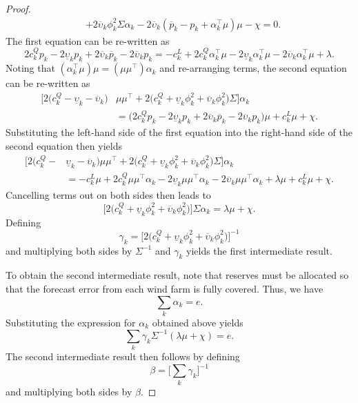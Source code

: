 \documentclass{article}
\begin{document}
\begin{proof}
\begin{align*}
&+ 2 \overline{\upsilon}_k \phi_k^2 \Sigma \alpha_k - 2 \overline{\upsilon}_k (\overline{p}_k - p_k + \alpha_k^\top \mu) \mu - \chi = 0.
\end{align*}
The first equation can be re-written as
\begin{equation*}
2c_k^Q p_k - 2 \underline{\upsilon}_k p_k + 2 \overline{\upsilon}_k \overline{p}_k - 2 \overline{\upsilon}_k p_k = -c_k^L + 2 c_k^Q \alpha_k^\top \mu - 2 \underline{\upsilon}_k \alpha_k^\top \mu - 2 \overline{\upsilon}_k \alpha_k^\top \mu + \lambda.
\end{equation*}
Noting that $(\alpha_k^\top \mu) \mu = (\mu \mu^\top) \alpha_k$ and re-arranging terms, the second equation can be re-written as
\begin{align*}
\bigg[2 \Big(c_k^Q - \underline{\upsilon}_k - \overline{\upsilon}_k\Big)& \mu \mu^\top + 2\Big(c_k^Q + \underline{\upsilon}_k \phi_k^2 + \overline{\upsilon}_k \phi_k^2\Big) \Sigma \bigg]\alpha_k\\
&= \big(2c_k^Q p_k - 2 \underline{\upsilon}_k p_k + 2 \overline{\upsilon}_k \overline{p}_k - 2 \overline{\upsilon}_k p_k\big) \mu + c_k^L \mu + \chi.
\end{align*}
Substituting the left-hand side of the first equation into the right-hand side of the second equation then yields
\begin{align*}
\bigg[2 \Big(c_k^Q -& \underline{\upsilon}_k - \overline{\upsilon}_k\Big) \mu \mu^\top + 2\Big(c_k^Q + \underline{\upsilon}_k \phi_k^2 + \overline{\upsilon}_k \phi_k^2\Big) \Sigma \bigg]\alpha_k\\
&= -c_k^L \mu + 2 c_k^Q \mu \mu^\top \alpha_k - 2 \underline{\upsilon}_k \mu \mu^\top \alpha_k - 2 \overline{\upsilon}_k \mu \mu^\top \alpha_k + \lambda \mu + c_k^L \mu + \chi.
\end{align*}
Cancelling terms out on both sides then leads to
\begin{equation*}
\bigg[2\Big(c_k^Q + \underline{\upsilon}_k \phi_k^2 + \overline{\upsilon}_k \phi_k^2\Big) \bigg] \Sigma \alpha_k = \lambda \mu + \chi.
\end{equation*}
Defining 
\begin{equation*}
\gamma_k = \bigg[2\Big(c_k^Q + \underline{\upsilon}_k \phi_k^2 + \overline{\upsilon}_k \phi_k^2\Big) \bigg]^{-1}
\end{equation*}
and multiplying both sides by $\Sigma^{-1}$ and $\gamma_k$ yields the first intermediate result. 

To obtain the second intermediate result, note that reserves must be allocated so that the forecast error from each wind farm is fully covered. Thus, we have
\begin{equation*}
\sum_k \alpha_k = e.
\end{equation*}
Substituting the expression for $\alpha_k$ obtained above yields
\begin{equation*}
\sum_k \gamma_k \Sigma^{-1} (\lambda \mu + \chi) = e.
\end{equation*}
The second intermediate result then follows by defining
\begin{equation*}
\beta = \bigg[\sum_k \gamma_k\bigg]^{-1}
\end{equation*}
and multiplying both sides by $\beta$.


\end{proof}
\end{document}

